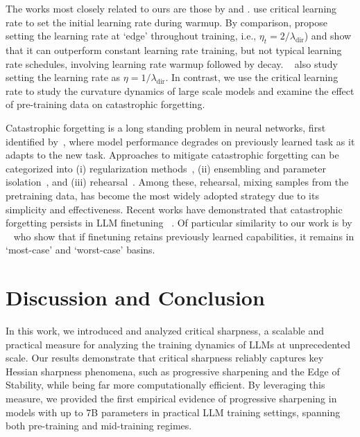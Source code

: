 \documentclass[]{fairmeta}
\theoremstyle{plain}
\theoremstyle{definition}
\begin{document}
The works most closely related to ours are those by \cite{kalra2024why} and \cite{roulet2024stepping}. \cite{kalra2024why} use critical learning rate to set the initial learning rate during warmup. By comparison, \cite{roulet2024stepping} propose setting the learning rate at `edge' throughout training, i.e., $\eta_t = 2/\lambda_{\text{dir}}$) and show that it can outperform constant learning rate training, but not typical learning rate schedules, involving learning rate warmup followed by decay. ~\citep{Vaswani2019Painless} also study setting the learning rate as $\eta = 1 / \lambda_{\text{dir}}$. In contrast, we use the critical learning rate to study the curvature dynamics of large scale models and examine the effect of pre-training data on catastrophic forgetting.

Catastrophic forgetting is a long standing problem in neural networks, first identified by~\cite{MCCLOSKEY1989109}, where model performance degrades on previously learned task as it adapts to the new task. Approaches to mitigate catastrophic forgetting can be categorized into (i) regularization methods~\citep{Kirkpatrick2017,Ahn2019}, (ii) ensembling and parameter isolation~\cite{rusu2016progressive,Aljundi2017}, and  (iii) rehearsal~\citep{ROBINS01061995,Lopez-Paz2017}. Among these, rehearsal, mixing samples from the pretraining data, has become the most widely adopted strategy due to its simplicity and effectiveness. Recent works have demonstrated that catastrophic forgetting persists in LLM finetuning~
\citep{lou2023_forgetting,huang-etal-2024-mitigating,scialom-etal-2022-fine}. Of particular similarity to our work is by ~\cite{chen2025understandingpretrainingfinetuningloss} who show that if finetuning retains previously learned capabilities, it remains in `most-case' and `worst-case' basins.

    
\section{Discussion and Conclusion}


In this work, we introduced and analyzed critical sharpness, a scalable and practical measure for analyzing the training dynamics of LLMs at unprecedented scale. Our results demonstrate that critical sharpness reliably captures key Hessian sharpness phenomena, such as progressive sharpening and the Edge of Stability, while being far more computationally efficient. By leveraging this measure, we provided the first empirical evidence of progressive sharpening in models with up to 7B parameters in practical LLM training settings, spanning both pre-training and mid-training regimes.
\end{document}
